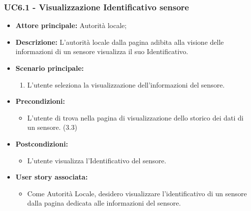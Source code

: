 \subsubsection{UC6.1 - Visualizzazione Identificativo sensore}
\begin{itemize}
    \item \textbf{Attore principale:} Autorità locale;
    \item \textbf{Descrizione:} L’autorità locale dalla pagina adibita alla visione delle informazioni di un sensore visualizza il suo Identificativo.
    \item \textbf{Scenario principale:}
    \begin{enumerate}
        \item L'utente seleziona la visualizzazione dell'informazioni del sensore.
    \end{enumerate}
\item \textbf{Precondizioni:}
    \begin{itemize}
        \item  L'utente di trova nella pagina di visualizzazione dello storico dei dati di un sensore. (3.3)
    \end{itemize}
    \item \textbf{Postcondizioni:}
          \begin{itemize}
              \item  L'utente visualizza l'Identificativo del sensore.
          \end{itemize}\item \textbf{User story associata:}
          \begin{itemize}
              \item Come Autorità Locale, desidero visualizzare l'identificativo di un sensore dalla pagina dedicata alle informazioni del sensore.
          \end{itemize}
\end{itemize}